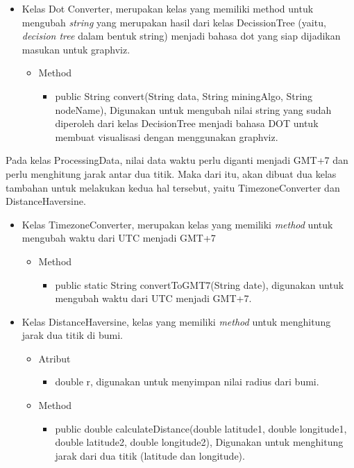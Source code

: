 \begin{itemize}
	\item Kelas Dot Converter, merupakan kelas yang memiliki method untuk mengubah \textsl{string} yang merupakan hasil dari kelas DecissionTree (yaitu, \textsl{decision tree} dalam bentuk string) menjadi bahasa dot yang siap dijadikan masukan untuk graphviz.
	\begin{itemize}
		\item Method
		\begin{itemize}
			\item public String convert(String data, String miningAlgo, String nodeName), Digunakan untuk mengubah nilai string yang sudah diperoleh dari kelas DecisionTree menjadi bahasa DOT untuk membuat visualisasi dengan menggunakan graphviz.
		\end{itemize}
	\end{itemize}
\end{itemize}
	
	Pada kelas ProcessingData, nilai data waktu perlu diganti menjadi GMT+7 dan perlu menghitung jarak antar dua titik. Maka dari itu, akan dibuat dua kelas tambahan untuk melakukan kedua hal tersebut, yaitu TimezoneConverter dan DistanceHaversine.
	
\begin{itemize}
	\item Kelas TimezoneConverter, merupakan kelas yang memiliki \textsl{method} untuk mengubah waktu dari UTC menjadi GMT+7
	\begin{itemize}
		\item Method
		\begin{itemize}
			\item public static String convertToGMT7(String date), digunakan untuk mengubah waktu dari UTC menjadi GMT+7.
		\end{itemize}
	\end{itemize}

	\item Kelas DistanceHaversine, kelas yang memiliki \textsl{method} untuk menghitung jarak dua titik di bumi.
	\begin{itemize}
		\item Atribut
		\begin{itemize}
			\item double r, digunakan untuk menyimpan nilai radius dari bumi.
		\end{itemize}
		\item Method
		\begin{itemize}
			\item public double calculateDistance(double latitude1, double longitude1, double latitude2, double longitude2), Digunakan untuk menghitung jarak dari dua titik (latitude dan longitude).
		\end{itemize}
	\end{itemize}
\end{itemize}

